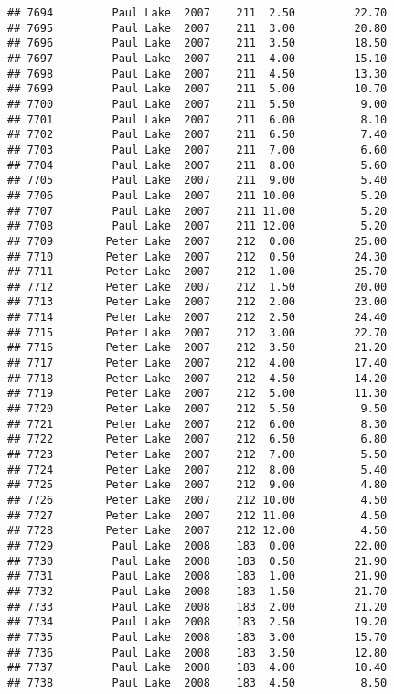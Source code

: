 \documentclass[
]{article}
\begin{document}
\begin{verbatim}
## 7694         Paul Lake  2007    211  2.50         22.70
## 7695         Paul Lake  2007    211  3.00         20.80
## 7696         Paul Lake  2007    211  3.50         18.50
## 7697         Paul Lake  2007    211  4.00         15.10
## 7698         Paul Lake  2007    211  4.50         13.30
## 7699         Paul Lake  2007    211  5.00         10.70
## 7700         Paul Lake  2007    211  5.50          9.00
## 7701         Paul Lake  2007    211  6.00          8.10
## 7702         Paul Lake  2007    211  6.50          7.40
## 7703         Paul Lake  2007    211  7.00          6.60
## 7704         Paul Lake  2007    211  8.00          5.60
## 7705         Paul Lake  2007    211  9.00          5.40
## 7706         Paul Lake  2007    211 10.00          5.20
## 7707         Paul Lake  2007    211 11.00          5.20
## 7708         Paul Lake  2007    211 12.00          5.20
## 7709        Peter Lake  2007    212  0.00         25.00
## 7710        Peter Lake  2007    212  0.50         24.30
## 7711        Peter Lake  2007    212  1.00         25.70
## 7712        Peter Lake  2007    212  1.50         20.00
## 7713        Peter Lake  2007    212  2.00         23.00
## 7714        Peter Lake  2007    212  2.50         24.40
## 7715        Peter Lake  2007    212  3.00         22.70
## 7716        Peter Lake  2007    212  3.50         21.20
## 7717        Peter Lake  2007    212  4.00         17.40
## 7718        Peter Lake  2007    212  4.50         14.20
## 7719        Peter Lake  2007    212  5.00         11.30
## 7720        Peter Lake  2007    212  5.50          9.50
## 7721        Peter Lake  2007    212  6.00          8.30
## 7722        Peter Lake  2007    212  6.50          6.80
## 7723        Peter Lake  2007    212  7.00          5.50
## 7724        Peter Lake  2007    212  8.00          5.40
## 7725        Peter Lake  2007    212  9.00          4.80
## 7726        Peter Lake  2007    212 10.00          4.50
## 7727        Peter Lake  2007    212 11.00          4.50
## 7728        Peter Lake  2007    212 12.00          4.50
## 7729         Paul Lake  2008    183  0.00         22.00
## 7730         Paul Lake  2008    183  0.50         21.90
## 7731         Paul Lake  2008    183  1.00         21.90
## 7732         Paul Lake  2008    183  1.50         21.70
## 7733         Paul Lake  2008    183  2.00         21.20
## 7734         Paul Lake  2008    183  2.50         19.20
## 7735         Paul Lake  2008    183  3.00         15.70
## 7736         Paul Lake  2008    183  3.50         12.80
## 7737         Paul Lake  2008    183  4.00         10.40
## 7738         Paul Lake  2008    183  4.50          8.50

\end{verbatim}
\end{document}
